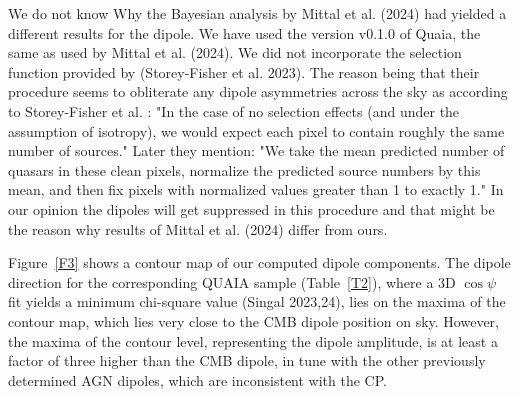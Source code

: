 \documentclass[fleqn,usenatbib]{mnras}
\begin{document}
We do not know Why the Bayesian analysis by Mittal et al. (2024) had yielded a different results for the dipole. We have used the version v0.1.0 of Quaia, the same as used by Mittal et al. (2024). We 
did not incorporate the selection function provided by (Storey-Fisher et al. 2023). The reason being that their procedure seems to  obliterate
any dipole asymmetries across the sky as according to Storey-Fisher et al. : "In
the case of no selection effects (and under the assumption of
isotropy), we would expect each pixel to contain roughly the same
number of sources." Later they mention: "We take the mean predicted
number of quasars in these clean pixels, normalize the predicted
source numbers by this mean, and then fix pixels with normalized
values greater than 1 to exactly 1." In our opinion the dipoles will
get suppressed in this procedure and that might be the reason why results of Mittal et al. (2024) differ from ours.

Figure~\ref{F3} shows a contour map of our computed dipole components. The dipole direction for the corresponding QUAIA sample (Table~\ref{T2}), where a 3D $\cos\psi$ fit yields a minimum chi-square value (Singal 2023,24), lies on the maxima of the contour map, which lies very close to the CMB dipole position on sky. However, the maxima of the contour level, representing the dipole amplitude, is at least a factor of three higher than the CMB dipole, in tune with the other previously determined  AGN dipoles, which are inconsistent with the CP. 
\end{document}
